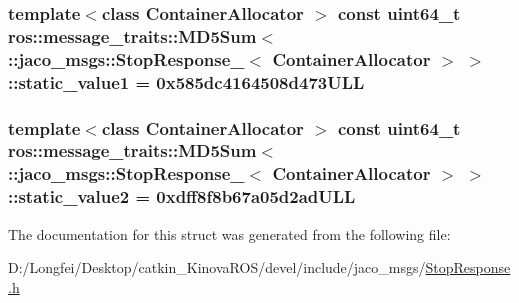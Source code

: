 \subsubsection[{\texorpdfstring{static\+\_\+value1}{static_value1}}]{\setlength{\rightskip}{0pt plus 5cm}template$<$class Container\+Allocator $>$ const uint64\+\_\+t ros\+::message\+\_\+traits\+::\+M\+D5\+Sum$<$ \+::{\bf jaco\+\_\+msgs\+::\+Stop\+Response\+\_\+}$<$ Container\+Allocator $>$ $>$\+::static\+\_\+value1 = 0x585dc4164508d473\+U\+LL\hspace{0.3cm}{\ttfamily [static]}}\hypertarget{structros_1_1message__traits_1_1MD5Sum_3_01_1_1jaco__msgs_1_1StopResponse___3_01ContainerAllocator_01_4_01_4_adc1c08fdf7e8d291d80f0f1b90bc931f}{}\label{structros_1_1message__traits_1_1MD5Sum_3_01_1_1jaco__msgs_1_1StopResponse___3_01ContainerAllocator_01_4_01_4_adc1c08fdf7e8d291d80f0f1b90bc931f}
\subsubsection[{\texorpdfstring{static\+\_\+value2}{static_value2}}]{\setlength{\rightskip}{0pt plus 5cm}template$<$class Container\+Allocator $>$ const uint64\+\_\+t ros\+::message\+\_\+traits\+::\+M\+D5\+Sum$<$ \+::{\bf jaco\+\_\+msgs\+::\+Stop\+Response\+\_\+}$<$ Container\+Allocator $>$ $>$\+::static\+\_\+value2 = 0xdff8f8b67a05d2ad\+U\+LL\hspace{0.3cm}{\ttfamily [static]}}\hypertarget{structros_1_1message__traits_1_1MD5Sum_3_01_1_1jaco__msgs_1_1StopResponse___3_01ContainerAllocator_01_4_01_4_acc54358a04cc3e36073fe84c4f7faad0}{}\label{structros_1_1message__traits_1_1MD5Sum_3_01_1_1jaco__msgs_1_1StopResponse___3_01ContainerAllocator_01_4_01_4_acc54358a04cc3e36073fe84c4f7faad0}


The documentation for this struct was generated from the following file\+:\begin{DoxyCompactItemize}
\item 
D\+:/\+Longfei/\+Desktop/catkin\+\_\+\+Kinova\+R\+O\+S/devel/include/jaco\+\_\+msgs/\hyperlink{StopResponse_8h}{Stop\+Response.\+h}\end{DoxyCompactItemize}
